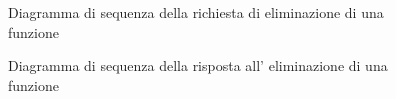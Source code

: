 \begin{figure}[H]
	\noindent
	\caption{Diagramma di sequenza della richiesta di eliminazione di una funzione}
\end{figure}
\begin{figure}[H]
	\noindent
	\caption{Diagramma di sequenza della risposta all' eliminazione di una funzione}
\end{figure}

